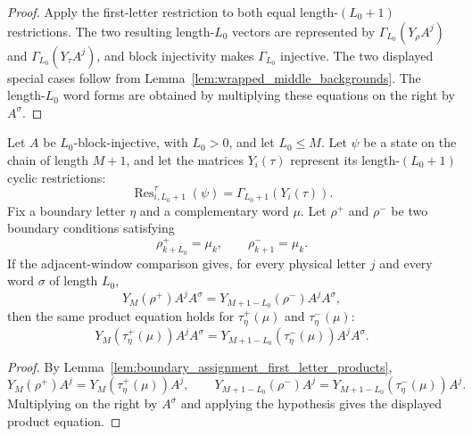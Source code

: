 \begin{proof}
    \leanok
    Apply the first-letter restriction to both equal length-$(L_0+1)$
    restrictions. The two resulting length-$L_0$ vectors are represented by
    $\Gamma_{L_0}(Y_\rho A^j)$ and $\Gamma_{L_0}(Y_\tau A^j)$, and block
    injectivity makes $\Gamma_{L_0}$ injective. The two displayed special cases
    follow from Lemma~\ref{lem:wrapped_middle_backgrounds}. The
    length-$L_0$ word forms are obtained by multiplying these equations on the
    right by $A^\sigma$.
\end{proof}

\begin{lemma}
    \label{lem:boundary_closing_product_compatible_backgrounds}
    \leanok
    Let $A$ be $L_0$-block-injective, with $L_0>0$, and let $L_0\le M$.
    Let $\psi$ be a state on the chain of length $M+1$, and let the matrices
    $Y_i(\tau)$ represent its length-$(L_0+1)$ cyclic restrictions:
    \[
        \operatorname{Res}^{\tau}_{i,L_0+1}(\psi)
        =
        \Gamma_{L_0+1}(Y_i(\tau)).
    \]
    Fix a boundary letter $\eta$ and a complementary word $\mu$. Let $\rho^+$
    and $\rho^-$ be two boundary conditions satisfying
    \[
        \rho^+_{k+L_0}=\mu_k,
        \qquad
        \rho^-_{k+1}=\mu_k .
    \]
    If the adjacent-window comparison gives, for every physical letter $j$ and
    every word $\sigma$ of length $L_0$,
    \[
        Y_M(\rho^+)A^jA^\sigma
        =
        Y_{M+1-L_0}(\rho^-)A^jA^\sigma ,
    \]
    then the same product equation holds for $\tau^+_\eta(\mu)$ and
    $\tau^-_\eta(\mu)$:
    \[
        Y_M(\tau^+_\eta(\mu))A^jA^\sigma
        =
        Y_{M+1-L_0}(\tau^-_\eta(\mu))A^jA^\sigma .
    \]
\end{lemma}

\begin{proof}
    \leanok
    By Lemma~\ref{lem:boundary_assignment_first_letter_products},
    \[
        Y_M(\rho^+)A^j = Y_M(\tau^+_\eta(\mu))A^j,
        \qquad
        Y_{M+1-L_0}(\rho^-)A^j
        =
        Y_{M+1-L_0}(\tau^-_\eta(\mu))A^j.
    \]
    Multiplying on the right by $A^\sigma$ and applying the hypothesis gives the
    displayed product equation.
\end{proof}

